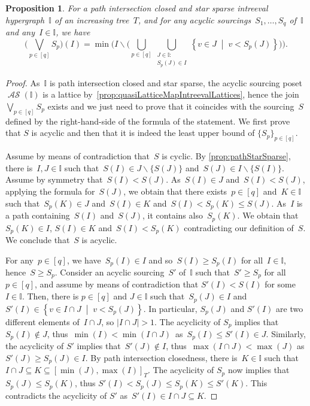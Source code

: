 \documentclass{amsart}
\newtheorem{proposition}[theorem]{Proposition}
\theoremstyle{definition}
\newcommand{\set}[2]{\left\{ #1 \;\middle|\; #2 \right\}} %
\newcommand{\ssm}{\smallsetminus} %
\newcommand{\bigJoin}{\bigvee} %
\DeclareMathOperator{\ASour}{\mathcal{AS}}  %
\newcommand{\II}{\mathbb I} %
\begin{document}
\begin{proposition}
\label{prop:expressionJoin}
For a path intersection closed and star sparse intreeval hypergraph~$\II$ of an increasing tree~$T$, and for any acyclic sourcings~$S_1, \dots, S_q$ of~$\II$ and any~$I \in \II$, we have
\[
\bigg( \bigJoin_{p \in [q]} S_p \bigg)(I) = \min \bigg( I \ssm \Big( \bigcup_{p \in [q]} \bigcup_{\substack{J \in \II : \\ S_p(J) \in I}} \set{v \in J}{v < S_p(J)} \Big) \bigg).
\]
\end{proposition}

\begin{proof}
As~$\II$ is path intersection closed and star sparse, the acyclic sourcing poset~$\ASour(\II)$ is a lattice by~\cref{prop:quasiLatticeMapIntreevalLattices}, hence the join~$\bigJoin_{p \in [q]} S_p$ exists and we just need to prove that it coincides with the sourcing~$S$ defined by the right-hand-side of the formula of the statement.
We first prove that $S$ is acyclic and then that it is indeed the least upper bound of $\{S_p\}_{p \in [q]}$.

Assume by means of contradiction that~$S$ is cyclic.
By \cref{prop:pathStarSparse}, there is~$I,J \in \II$ such that~$S(I) \in J \ssm \{S(J)\}$ and~$S(J) \in I \ssm \{S(I)\}$.
Assume by symmetry that~$S(I) < S(J)$.
As~${S(I) \in J}$ and~$S(I) < S(J)$, applying the formula for~$S(J)$, we obtain that there exists~${p \in [q]}$ and~$K \in \II$ such that~$S_p(K) \in J$ and~$S(I) \in K$ and~$S(I) < S_p(K) \le S(J)$.
As~$I$ is a path containing~$S(I)$ and~$S(J)$, it contains also~$S_p(K)$.
We obtain that~$S_p(K) \in I$, $S(I) \in K$ and~${S(I) < S_p(K)}$ contradicting our definition of~$S$.
We conclude that~$S$ is acyclic.

For any~$p \in [q]$, we have~$S_p(I) \in I$ and so~$S(I) \ge S_p(I)$ for all~$I \in \II$, hence~$S \ge S_p$.
Consider an acyclic sourcing~$S'$ of~$\II$ such that~$S' \ge S_p$ for all~$p \in [q]$,
and assume by means of contradiction that $S'(I) < S(I)$ for some $I \in \II$.
Then, there is $p \in [q]$ and $J \in \II$ such that~$S_p(J) \in I$ and $S'(I) \in \set{v \in I \cap J}{v < S_p(J)}$.
In particular, $S_p(J)$ and $S'(I)$ are two different elements of~$I \cap J$, so $|I \cap J| > 1$.
The acyclicity of $S_p$ implies that $S_p(I) \notin J$, thus~${\min(I) < \min(I \cap J)}$~as~${S_p(I) \leq S'(I) \in J}$.
Similarly, the acyclicity of $S'$ implies that~${S'(J) \notin I}$, thus~${\max(I \cap J) < \max(J)}$ as $S'(J) \geq S_p(J) \in I$.
By path intersection closedness, there is~$K \in \II$ such that $I \cap J \subseteq K \subseteq [\min(J),\max(I)]_T$.
The acyclicity of $S_p$ now implies that $S_p(J) \leq S_p(K)$, thus $S'(I) < S_p(J) \leq S_p(K) \leq S'(K)$.
This contradicts the acyclicity of $S'$ as~${S'(I) \in I \cap J \subseteq K}$.
\end{proof}
\end{document}
